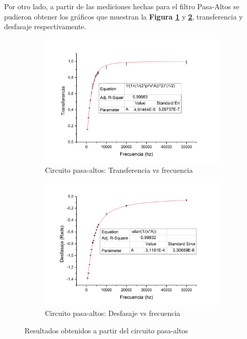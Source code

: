 \documentclass[11pt,a4paper]{article}
\begin{document}
\bigskip

Por otro lado, a partir de las mediciones hechas para el filtro Pasa-Altos se pudieron obtener los gráficos que muestran la \textbf{Figura \ref{subfig:PA.a}} y \textbf{\ref{subfig:PA.b}}, transferencia y desfasaje respectivamente.

\begin{figure}[h]
\begin{subfigure}{0.5\textwidth}
\includegraphics[scale=0.34]{PA_TRANSFERENCIA}
  \caption{Circuito pasa-altos: Transferencia vs frecuencia }
  \label{subfig:PA.a}
\end{subfigure}
\begin{subfigure}{0.5\textwidth}
\includegraphics[scale=0.34]{PA_DESFASAJE}
  \caption{Circuito pasa-altos: Desfasaje vs frecuencia}
  \label{subfig:PA.b}
\end{subfigure}
  \caption{Resultados obtenidos a partir del circuito pasa-altos}
  \label{fig:PA}
\end{figure}
\end{document}
